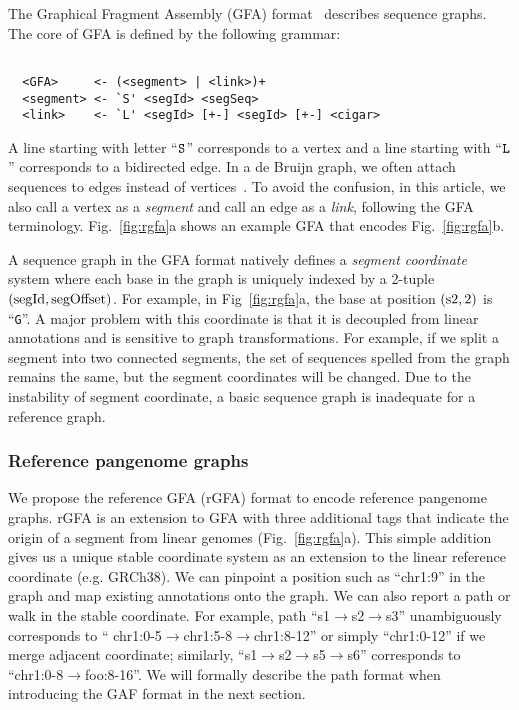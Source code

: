 \documentclass[twocolumn]{bmcart}
\begin{document}
The Graphical Fragment Assembly (GFA) format~\cite{Li:2016aa} describes
sequence graphs. The core of GFA is defined by the following grammar:

{\footnotesize
\begin{verbatim}

  <GFA>     <- (<segment> | <link>)+
  <segment> <- `S' <segId> <segSeq>
  <link>    <- `L' <segId> [+-] <segId> [+-] <cigar>

\end{verbatim}}

{\flushleft
A line starting with letter ``${\tt S}$'' corresponds to a vertex and a line
starting with ``${\tt L}$'' corresponds
to a bidirected edge. In a de Bruijn graph, we often attach sequences to edges
instead of vertices~\cite{Pevzner:2001vn,Gnerre:2011ys}. To avoid the confusion, in this
article, we also call a vertex as a \emph{segment} and call an edge as a
\emph{link}, following the GFA terminology.  Fig.~\ref{fig:rgfa}a shows an
example GFA that encodes Fig.~\ref{fig:rgfa}b.
}

A sequence graph in the GFA format natively defines a \emph{segment coordinate}
system where each base in the graph is uniquely indexed by a
2-tuple $({\rm segId},{\rm segOffset})$. For example, in
Fig~\ref{fig:rgfa}a, the base at position $({\rm s2},2)$ is ``{\tt G}''.
A major problem with this coordinate is that it is decoupled from linear
annotations and is sensitive to graph transformations. For example, if we split
a segment into two connected segments, the set of sequences spelled from the graph
remains the same, but the segment coordinates will be changed. Due to the
instability of segment coordinate, a basic sequence graph is inadequate for a
reference graph.

\subsubsection*{Reference pangenome graphs}

We propose the reference GFA (rGFA) format to encode reference pangenome graphs.
rGFA is an extension to GFA with three additional tags that indicate the origin
of a segment from linear genomes (Fig.~\ref{fig:rgfa}a). This simple addition
gives us a unique stable coordinate system as an extension to the linear
reference coordinate (e.g. GRCh38). We can pinpoint a position such as
``{\sf chr1:9}'' in the graph and map existing annotations onto the graph. We can
also report a path or walk in the stable coordinate. For example, path
``{\sf s1$\to$s2$\to$s3}'' unambiguously corresponds to ``{\sf
chr1:0-5$\to$chr1:5-8$\to$chr1:8-12}'' or simply ``{\sf chr1:0-12}'' if we
merge adjacent coordinate; similarly, ``{\sf s1$\to$s2$\to$s5$\to$s6}''
corresponds to ``{\sf chr1:0-8$\to$foo:8-16}''. We will formally describe the
path format when introducing the GAF format in the next section.
\end{document}
